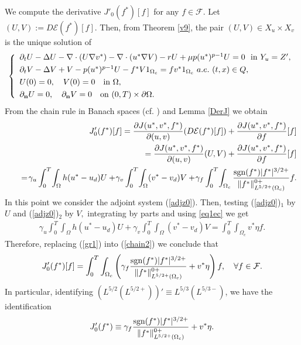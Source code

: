 \documentclass[11pt,reqno]{amsart}%
\numberwithin{equation}{section}
\begin{document}
{We compute the derivative $J'_0(f^*)[f]$ for any  $f\in \mathcal{F}.$ Let $(U,V):=D\mathcal{E}(f^*)[f].$ Then, from Theorem \ref{v9}, the pair $(U,V)\in X_u\times X_v$ is the unique solution of
\begin{align} \label{eq1ec}
	\left\{
	\begin{array}
		[c]{lll}%
		\partial_t U-\Delta U -\nabla\cdot (U\nabla v^*)- \nabla\cdot(u^*\nabla V)-r U+\mu p(u^*)^{p-1}U=0\  \mbox{ in}\  Y_u=Z', \\
		 \noalign{\vspace{-2ex}}\\
		\partial_t V -\Delta V + V - p (u^*)^{p-1} U-f^*V1_{\Omega_c}=fv^*1_{\Omega_c}\  a.e.\ (t,x)\in Q,\\
		 \noalign{\vspace{-2ex}}\\
		U(0)=0, \quad V(0)=0\quad \mbox{in}\ \Omega,\\	
		 \noalign{\vspace{-2ex}}\\
		\partial_{\bf n} U=0,\quad \partial_{\bf n} V=0\quad \mbox{on }(0,T)\times\partial\Omega.
	\end{array}
	\right.  %
\end{align}
From the chain rule in Banach spaces (cf. \cite[Theorem 3.6]{Kumar}) and Lemma \ref{DerJ} we obtain
\begin{eqnarray}
&&J_0'(f^*)[f]=\frac{\partial J(u^*,v^*,f^*)}{\partial (u,v)}
( D\mathcal{E}(f^*)[f])+\frac{\partial J(u^*,v^*,f^*)}{\partial f}[f]\nonumber\\
&&\ \ = \frac{\partial J(u^*,v^*,f^*)}{\partial (u,v)}(U,V)
+\frac{\partial J(u^*,v^*,f^*)}{\partial f}[f]\nonumber\\
&&\ \ =\!\gamma_u\int_0^T\!\int_\Omega 
h({u^*-u_d}) 
U+\!\gamma_v\int_0^T\!\int_\Omega (v^*-v_d)V+\!\gamma_f\int_0^T\!\int_{\Omega_c} 
\frac{{\rm sgn}(f^*)\vert f^*\vert^{3/2+}}{\|f^*\|^{0+}_{L^{5/2+}(\Omega_c)}}{f}.
\label{chain2}
\end{eqnarray} 
 In this point we consider the adjoint system (\ref{adjz0}). Then, testing (\ref{adjz0})$_1$ by $U$ and (\ref{adjz0})$_2$ by $V,$  integrating by parts and using \eqref{eq1ec} we get
\begin{eqnarray}\label{gr1}
\gamma_u\int_0^T\int_\Omega 
h({u^*-u_d}) 
U+\gamma_v\int_0^T\int_\Omega (v^*-v_d)V
=\int_0^T\int_{\Omega_c} {v^*}\eta f.
\end{eqnarray}
Therefore, replacing (\ref{gr1}) into (\ref{chain2}) we conclude that  
\begin{eqnarray}\label{cop2}
J_0'(f^*)[f]=\int_0^T\int_{\Omega_c}\left(
\gamma_f 
\frac{{\rm sgn}(f^*)\vert f^*\vert^{3/2+}}{\|f^*\|^{0+}_{L^{5/2+}(\Omega_c)}}+{v^*}\eta\right)f , 
\quad  \forall {f}\in\mathcal{F}.
\end{eqnarray}
In particular, identifying $(L^{5/2}(L^{5/2+}))' \equiv L^{5/3}(L^{5/3-})$, we have the identification
$$
J_0'(f^*) \equiv \gamma_f
\frac{{\rm sgn}(f^*)\vert f^*\vert^{3/2+}}{\|f^*\|^{0+}_{L^{5/2+}(\Omega_c)}}
+{v^*}\eta.
$$
%
}
\end{document}
